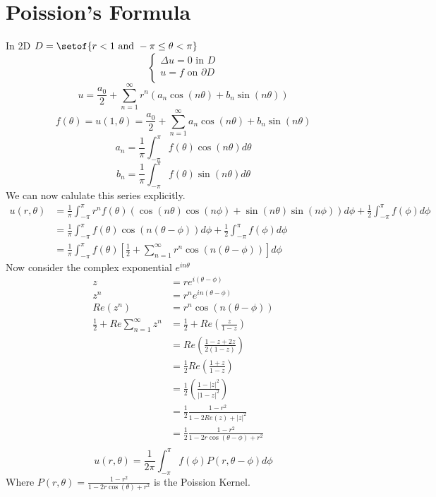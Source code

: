 \documentclass[answers,12pt,addpoints]{exam}
\begin{document}
\section{Poission's Formula}
In 2D $D = \setof{r < 1 \text{ and } -\pi \leq \theta < \pi}$\\
$$\begin{cases}
    \Delta u = 0 \text{ in } D\\
    u = f \text{ on } \partial D\\
\end{cases}$$
$$ u = \frac{a_0}{2} + \sum_{n=1}^{\infty} r^n (a_n \cos(n\theta) + b_n \sin(n\theta))$$
$$f(\theta) = u(1,\theta) = \frac{a_0}{2} + \sum_{n=1}^{\infty} a_n \cos(n\theta) + b_n \sin(n\theta)$$
$$a_n = \frac{1}{\pi} \int_{-\pi}^{\pi} f(\theta) \cos(n\theta) d\theta$$
$$b_n = \frac{1}{\pi} \int_{-\pi}^{\pi} f(\theta) \sin(n\theta) d\theta$$
We can now calulate this series explicitly.\\
\begin{align*}
    u(r,\theta) &= \frac{1}{\pi} \int_{-\pi}^{\pi} r^n f(\theta) \left(\cos(n\theta)\cos(n\phi) + \sin(n\theta)\sin(n\phi)\right)d\phi + \frac{1}{2} \int_{-\pi}^{\pi} f(\phi)d\phi\\
    &= \frac{1}{\pi} \int_{-\pi}^{\pi} f(\theta) \cos(n(\theta - \phi))d\phi + \frac{1}{2} \int_{-\pi}^{\pi} f(\phi)d\phi\\
    &= \frac{1}{\pi} \int_{-\pi}^{\pi} f(\theta) \left[\frac{1}{2} + \sum_{n=1}^\infty r^n \cos(n(\theta - \phi))\right] d\phi
\end{align*}
Now consider the complex exponential $e^{in\theta}$\\
\begin{align*}
    z &= re^{i(\theta -\phi)}\\
    z^n &= r^n e^{in(\theta - \phi)}\\
    Re(z^n) &= r^n \cos(n(\theta - \phi))\\
    \frac{1}{2} + Re\sum_{n=1}^\infty z^n &= \frac{1}{2} + Re\left(\frac{z}{1-z}\right)\\
    &= Re\left(\frac{1-z +2z}{2(1-z)}\right)\\
    &= \frac{1}{2}Re\left(\frac{1+z}{1-z}\right)\\
    &= \frac{1}{2} \left( \frac{1- |z|^2}{|1-z|^2}\right)\\
    &= \frac{1}{2} \frac{1 - r^2}{1 - 2Re(z) + |z|^2}\\
    &= \frac{1}{2} \frac{1 - r^2}{1 - 2r\cos(\theta - \phi) + r^2}\\
\end{align*}
$$ u(r,\theta) = \frac{1}{2\pi} \int_{-\pi}^{\pi} f(\phi) P(r,\theta - \phi) d\phi$$
Where $P(r,\theta) = \frac{1 - r^2}{1 - 2r\cos(\theta) + r^2}$ is the Poission Kernel.\\
\end{document}
